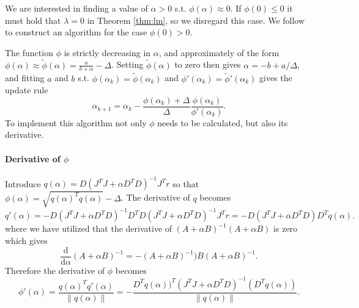 We are interested in finding a value of $\alpha > 0$ s.t. $\phi(\alpha) \approx 0$. If $\phi(0) \leq 0$ it must hold that $\lambda = 0$ in Theorem \ref{thm:lm}, so we disregard this case. We follow \cite{watson_levenberg-marquardt_1978} to construct an algorithm for the case $\phi(0) > 0$.

The function $\phi$ is strictly decreasing in $\alpha$, and approximately of the form $\phi(\alpha) \approx \tilde \phi(\alpha) = \frac{a}{b + \alpha} - \Delta$. Setting $\tilde \phi(\alpha)$ to zero then gives $\alpha = -b + a / \Delta$, and fitting $a$ and $b$ s.t. $\phi(\alpha_{k}) = \tilde \phi(\alpha_{k})$ and $\phi'(\alpha_{k}) = \tilde \phi'(\alpha_{k})$ gives the update rule
\begin{equation}
  \alpha_{k+1} = \alpha_{k} - \frac{\phi(\alpha_{k}) + \Delta}{\Delta} \frac{\phi(\alpha_{k})}{\phi'(\alpha_{k})}.
\end{equation}
To implement this algorithm not only $\phi$ needs to be calculated, but also its derivative.

\paragraph{Derivative of $\phi$} Introduce $q(\alpha) = D (J^{T} J + \alpha D^{T} D)^{-1} J^{T} r$ so that $\phi(\alpha) = \sqrt{q(\alpha)^{T} q(\alpha)} - \Delta$. The derivative of $q$ becomes
\begin{equation}
  q'(\alpha) = -D (J^{T} J + \alpha D^{T} D)^{-1} D^{T} D (J^{T} J + \alpha D^{T} D)^{-1} J^{T} r = -D (J^{T} J + \alpha D^{T} D) D^{T} q(\alpha).
\end{equation}
where we have utilized that the derivative of $(A + \alpha B)^{-1} (A + \alpha B)$ is zero which gives
\begin{equation}
  \frac{\mathrm{d}}{\mathrm{d}\alpha} (A + \alpha B)^{-1} = - (A + \alpha B)^{-1}) B (A + \alpha B)^{{-1}}.
\end{equation}
Therefore the derivative of $\phi$ becomes
\begin{equation}
  \phi'(\alpha) = \frac{q(\alpha)^{T} q'(\alpha)}{\| q(\alpha) \|} = -\frac{D^{T}q(\alpha))^{T} (J^{T} J + \alpha D^{T} D)^{-1} (D^{T} q(\alpha))}{\| q(\alpha) \|}.
\end{equation}

